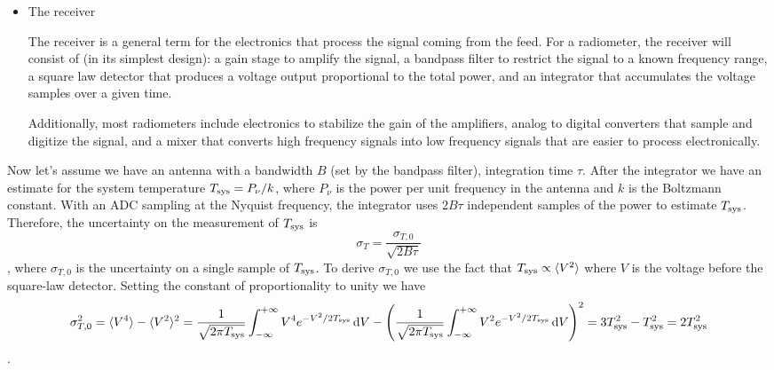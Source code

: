 \begin{enumerate}
\begin{itemize}
      \item The receiver

            The receiver is a general term for the electronics that process the signal coming
            from the feed.  For a radiometer, the receiver will consist of (in its simplest design):
            a gain stage to amplify the signal,
            a bandpass filter to restrict the signal to a known frequency range,
            a square law detector that produces a voltage output proportional to the total
            power, and an integrator that accumulates the voltage samples over a given time.

            Additionally, most radiometers include electronics to stabilize the gain of the
            amplifiers, analog to digital converters that sample and digitize the signal, and a mixer that converts high frequency signals into low frequency signals
            that are easier to process electronically.
      \end{itemize}

      Now let's assume we have an antenna with a bandwidth $B$ (set by the bandpass filter),
      integration time $\tau$.  After the integrator we have an estimate for the system
      temperature $T_{\rm sys} = P_\nu/k$, where $P_\nu$ is the power per unit frequency in the
      antenna and $k$ is the Boltzmann constant.  With an ADC sampling at the Nyquist frequency,
      the integrator uses $2B\tau$ independent samples of the power to estimate $T_{\rm sys}$.
      Therefore, the uncertainty on the measurement of $T_{\rm sys}$ is
      \begin{dmath*}
        \sigma_T = \frac{\sigma_{T,0}}{\sqrt{2B\tau}}
      \end{dmath*},
      where $\sigma_{T,0}$ is the uncertainty on a single sample of $T_{\rm sys}$.  To derive
      $\sigma_{T,0}$ we use the fact that $T_{\rm sys} \propto \langle V^2\rangle$ where $V$
      is the voltage before the square-law detector.  Setting the constant of proportionality
      to unity we have
      \begin{dmath*}
        \sigma_{T,0}^2 = \langle V^4\rangle - \langle V^2\rangle^2
                       = \frac{1}{\sqrt{2\pi T_{\rm sys}}}\int_{-\infty}^{+\infty} V^4e^{-V^2/2T_{\rm sys}}\,\d V
                       - \left(\frac{1}{\sqrt{2\pi T_{\rm sys}}}\int_{-\infty}^{+\infty} V^2e^{-V^2/2T_{\rm sys}}\,\d V\right)^2
                       = 3T_{\rm sys}^2 - T_{\rm sys}^2 \nolinebreak = 2T_{\rm sys}^2
      \end{dmath*}.


\end{enumerate}

